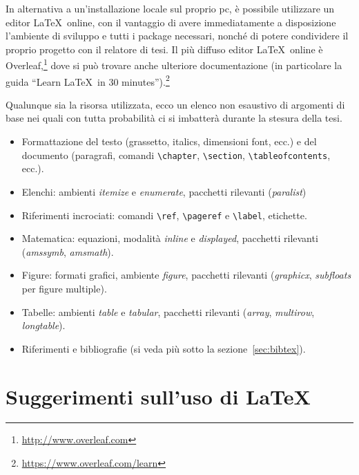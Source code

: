 \documentclass[12pt]{report}
\begin{document}
    In alternativa a un'installazione locale sul proprio pc, \`e possibile utilizzare un editor \LaTeX\ online, con il vantaggio di avere immediatamente a disposizione l'ambiente di sviluppo e tutti i package necessari, nonch\'e di potere condividere il proprio progetto con il relatore di tesi. Il pi\`u diffuso editor \LaTeX\ online \`e Overleaf,\footnote{\url{http://www.overleaf.com}} dove si pu\`o trovare anche ulteriore documentazione (in particolare la guida ``Learn \LaTeX\ in 30 minutes'').\footnote{\url{https://www.overleaf.com/learn}}

    Qualunque sia la risorsa utilizzata, ecco un elenco non esaustivo di argomenti di base nei quali con tutta probabilit\`a ci si imbatter\`a durante la stesura della tesi.
    \begin{itemize}
        \item Formattazione del testo (grassetto, italics, dimensioni font, ecc.) e del documento (paragrafi, comandi \verb|\chapter|, \verb|\section|, \verb|\tableofcontents|, ecc.).
        \item Elenchi: ambienti {\em itemize} e {\em enumerate}, pacchetti rilevanti ({\em paralist})
        \item Riferimenti incrociati: comandi \verb|\ref|, \verb|\pageref| e \verb|\label|, etichette.
        \item Matematica: equazioni, modalit\`a {\em inline} e {\em displayed}, pacchetti rilevanti ({\em amssymb}, {\em amsmath}).
        \item Figure: formati grafici, ambiente {\em figure}, pacchetti rilevanti ({\em graphicx}, {\em subfloats} per figure multiple).
        \item Tabelle: ambienti {\em table} e {\em tabular}, pacchetti rilevanti ({\em array}, {\em multirow}, {\em longtable}).
        \item Riferimenti e bibliografie (si veda pi\`u sotto la sezione~\ref{sec:bibtex}).
    \end{itemize}


    \section{Suggerimenti sull'uso di \LaTeX}
    \label{sec:consigli_latex}
\end{document}
